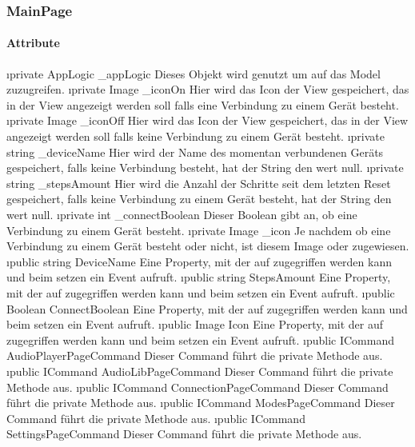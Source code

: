\documentclass[../entwurf.tex]{subfiles}
\begin{document}
\subsubsection{MainPage}
\paragraph{Attribute}
\begin{itemize}
	\i{private AppLogic \_appLogic} Dieses Objekt wird genutzt um auf das Model zuzugreifen.
	\i{private Image \_iconOn} Hier wird das Icon der View gespeichert, das in der View angezeigt werden soll falls eine Verbindung zu einem Gerät besteht.
	\i{private Image \_iconOff} Hier wird das Icon der View gespeichert, das in der View angezeigt werden soll falls keine Verbindung zu einem Gerät besteht.
	\i{private string \_deviceName} Hier wird der Name des momentan verbundenen Geräts gespeichert, falls keine Verbindung besteht, hat der String den wert null.
	\i{private string \_stepsAmount} Hier wird die Anzahl der Schritte seit dem letzten Reset gespeichert, falls keine Verbindung zu einem Gerät besteht, hat der String den wert null.
	\i{private int \_connectBoolean} Dieser Boolean gibt an, ob eine Verbindung zu einem Gerät besteht.
	\i{private Image \_icon} Je nachdem ob eine Verbindung zu einem Gerät besteht oder nicht, ist diesem Image  oder  zugewiesen.
	\i{public string DeviceName} Eine Property, mit der auf  zugegriffen werden kann und beim setzen ein Event aufruft.
	\i{public string StepsAmount} Eine Property, mit der auf  zugegriffen werden kann und beim setzen ein Event aufruft.
	\i{public Boolean ConnectBoolean} Eine Property, mit der auf  zugegriffen werden kann und beim setzen ein Event aufruft.
	\i{public Image Icon} Eine Property, mit der auf  zugegriffen werden kann und beim setzen ein Event aufruft.
	\i{public ICommand AudioPlayerPageCommand} Dieser Command führt die private Methode  aus.
	\i{public ICommand AudioLibPageCommand} Dieser Command führt die private Methode  aus.
	\i{public ICommand ConnectionPageCommand} Dieser Command führt die private Methode  aus.
	\i{public ICommand ModesPageCommand} Dieser Command führt die private Methode  aus.
	\i{public ICommand SettingsPageCommand} Dieser Command führt die private Methode  aus.
\end{itemize}
\end{document}
